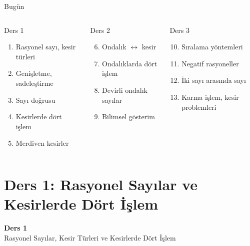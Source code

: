 \documentclass[aspectratio=169,11pt,handout]{beamer}
\begin{document}
\begin{frame}{Bugün}
\begin{columns}[t]
\begin{block}{Ders 1}
\begin{enumerate}
\item Rasyonel sayı, kesir türleri
\item Genişletme, sadeleştirme
\item Sayı doğrusu
\item Kesirlerde dört işlem
\item Merdiven kesirler
\end{enumerate}
\end{block}
\begin{block}{Ders 2}
\begin{enumerate}\setcounter{enumi}{5}
\item Ondalık \(\leftrightarrow\) kesir
\item Ondalıklarda dört işlem
\item Devirli ondalık sayılar
\item Bilimsel gösterim
\end{enumerate}
\end{block}
\begin{block}{Ders 3}
\begin{enumerate}\setcounter{enumi}{9}
\item Sıralama yöntemleri
\item Negatif rasyoneller
\item İki sayı arasında sayı
\item Karma işlem, kesir problemleri
\end{enumerate}
\end{block}
\end{columns}
\end{frame}

\section{Ders 1: Rasyonel Sayılar ve Kesirlerde Dört İşlem}
\begin{frame}
\centering\Large\color{anamavi}\textbf{Ders 1}\\[6pt]\normalsize Rasyonel Sayılar, Kesir Türleri ve Kesirlerde Dört İşlem
\end{frame}
\end{document}
